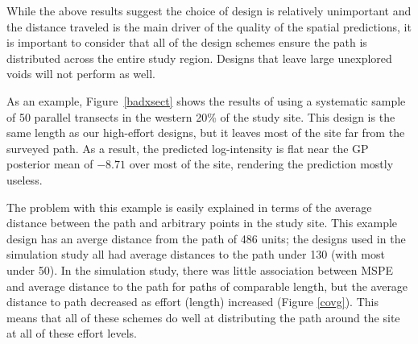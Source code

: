 \documentclass[review]{elsarticle}
\begin{document}
While the above results suggest the choice of design is relatively unimportant
and the distance traveled is the main driver of the quality of the spatial
predictions, it is important to consider that all of the design schemes ensure
the path is distributed across the entire study region. Designs that leave
large unexplored voids will not perform as well.

As an example, Figure~\ref{badxsect} shows the results of using a systematic
sample of 50 parallel transects in the western 20\% of the study site. This
design is the same length as our high-effort designs, but it leaves most of the
site far from the surveyed path. As a result, the predicted log-intensity is
flat near the GP posterior mean of \(-8.71\) over most of the site, rendering
the prediction mostly useless.

The problem with this example is easily explained in terms of the average
distance between the path and arbitrary points in the study site. This example
design has an averge distance from the path of 486 units; the designs used in
the simulation study all had average distances to the path under 130 (with most
under 50). In the simulation study, there was little association between
MSPE and average distance to the path for paths of comparable length, but the
average distance to path decreased as effort (length) increased
(Figure \ref{covg}). This means that all of these schemes do well at
distributing the path around the site at all of these effort levels.
\end{document}

